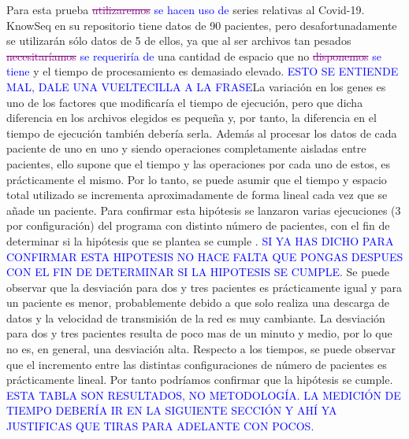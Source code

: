 Para esta prueba \textcolor{purple}{\sout{utilizaremos}} \textcolor{blue}{se hacen uso de} series relativas al Covid-19. KnowSeq en su repositorio tiene datos de 90 pacientes, pero desafortunadamente se utilizarán sólo datos de 5 de ellos, ya que al ser archivos tan pesados \textcolor{purple}{\sout{necesitaríamos}} \textcolor{blue}{se requeriría de} una cantidad de espacio que no \textcolor{purple}{\sout{disponemos}} \textcolor{blue}{se tiene} y el tiempo de procesamiento es demasiado elevado. \textcolor{blue}{ESTO SE ENTIENDE MAL, DALE UNA VUELTECILLA A LA FRASE}La variación en los genes es uno de los factores que modificaría el tiempo de ejecución, pero que dicha diferencia en los archivos elegidos es pequeña y, por tanto, la diferencia en el tiempo de ejecución también debería serla. Además al procesar los datos de cada paciente de uno en uno y siendo operaciones completamente aisladas entre pacientes, ello supone que el tiempo y las operaciones por cada uno de estos, es prácticamente el mismo. Por lo tanto, se puede asumir que el tiempo y espacio total utilizado se incrementa aproximadamente de forma lineal cada vez que se añade un paciente. Para confirmar esta hipótesis se lanzaron varias ejecuciones (3 por configuración) del programa con distinto número de pacientes, con el fin de determinar si la hipótesis que se plantea se cumple . \textcolor{blue}{SI YA HAS DICHO PARA CONFIRMAR ESTA HIPOTESIS NO HACE FALTA QUE PONGAS DESPUES CON EL FIN DE DETERMINAR SI LA HIPOTESIS SE CUMPLE}. Se puede observar que la desviación para dos y tres pacientes es prácticamente igual y para un paciente es menor, probablemente debido a que solo realiza una descarga de datos y la velocidad de transmisión de la red es muy cambiante. La desviación para dos y tres pacientes resulta de poco mas de un minuto y medio, por lo que no es, en general, una desviación alta. Respecto a los tiempos, se puede observar que el incremento entre las distintas configuraciones de número de pacientes es prácticamente lineal. Por tanto podríamos confirmar que la hipótesis se cumple. \\

\textcolor{blue}{ESTA TABLA SON RESULTADOS, NO METODOLOGÍA. LA MEDICIÓN DE TIEMPO DEBERÍA IR EN LA SIGUIENTE SECCIÓN Y AHÍ YA JUSTIFICAS QUE TIRAS PARA ADELANTE CON POCOS.}


